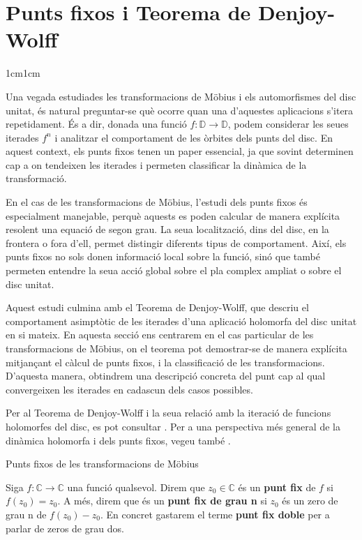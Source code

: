 \section{Punts fixos i Teorema de Denjoy-Wolff}

\begin{adjustwidth}{1cm}{1cm}

Una vegada estudiades les transformacions de Möbius i els automorfismes del disc unitat, és natural preguntar-se què ocorre quan una d'aquestes aplicacions s'itera repetidament. És a dir, donada una funció $f : \mathbb{D} \to \mathbb{D}$, podem considerar les seues iterades $f^n$ i analitzar el comportament de les òrbites dels punts del disc. En aquest context, els punts fixos tenen un paper essencial, ja que sovint determinen cap a on tendeixen les iterades i permeten classificar la dinàmica de la transformació.

En el cas de les transformacions de Möbius, l'estudi dels punts fixos és especialment manejable, perquè aquests es poden calcular de manera explícita resolent una equació de segon grau. La seua localització, dins del disc, en la frontera o fora d'ell, permet distingir diferents tipus de comportament. Així, els punts fixos no sols donen informació local sobre la funció, sinó que també permeten entendre la seua acció global sobre el pla complex ampliat o sobre el disc unitat.

Aquest estudi culmina amb el Teorema de Denjoy-Wolff, que descriu el comportament asimptòtic de les iterades d'una aplicació holomorfa del disc unitat en si mateix. En aquesta secció ens centrarem en el cas particular de les transformacions de Möbius, on el teorema pot demostrar-se de manera explícita mitjançant el càlcul de punts fixos, i la classificació de les transformacions. D'aquesta manera, obtindrem una descripció concreta del punt cap al qual convergeixen les iterades en cadascun dels casos possibles.

Per al Teorema de Denjoy-Wolff i la seua relació amb la iteració de funcions holomorfes del disc, es pot consultar \cite[Cap. 5]{shapiro}. Per a una perspectiva més general de la dinàmica holomorfa i dels punts fixos, vegeu també \cite{milnor}.


\begin{subsection}{Punts fixos de les transformacions de Möbius}

\begin{definicio}
    Siga $f:\mathbb{C}\to \mathbb{C}$ una funció qualsevol. Direm que $z_0\in \mathbb{C}$ és un \textbf{punt fix} de $f$ si $f(z_0)=z_0$. A més, direm que és un \textbf{punt fix de grau n} si $z_0$ és un zero de grau n de $f(z_0)-z_0$. En concret gastarem el terme \textbf{punt fix doble} per a parlar de zeros de grau dos.
\end{definicio}


\end{subsection}
\end{adjustwidth}
